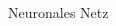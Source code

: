 \begin{frame}[t]{Neuronales Netz}
\begin{columns}
\begin{column}{0.5\textwidth}
				\end{column}
		\end{columns}
\end{frame}
